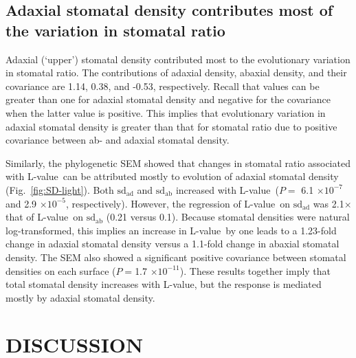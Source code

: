 \documentclass[12pt, oneside]{article}
\newcommand{\el}{L-value}
\begin{document}
\subsection*{Adaxial stomatal density contributes most of the variation in stomatal ratio}

Adaxial (`upper') stomatal density contributed most to the evolutionary variation in stomatal ratio. The contributions of adaxial density, abaxial density, and their covariance are 1.14, 0.38, and -0.53, respectively. Recall that values can be greater than one for adaxial stomatal density and negative for the covariance when the latter value is positive. This implies that evolutionary variation in adaxial stomatal density is greater than that for stomatal ratio due to positive covariance between ab- and adaxial stomatal density.

Similarly, the phylogenetic SEM showed that changes in stomatal ratio associated with \el~can be attributed mostly to evolution of adaxial stomatal density (Fig.~\ref{fig:SD-light}). Both $\mathrm{sd_{ad}}$ and $\mathrm{sd_{ab}}$ increased with \el~($P =$ 6.1 $\times10^{-7}$ and 2.9 $\times10^{-5}$, respectively). However, the regression of \el~on $\mathrm{sd_{ad}}$ was 2.1$\times$ that of \el~on $\mathrm{sd_{ab}}$ (0.21 versus 0.1). Because stomatal densities were natural log-transformed, this implies an increase in \el~by one leads to a 1.23-fold change in adaxial stomatal density versus a 1.1-fold change in abaxial stomatal density. The SEM also showed a significant positive covariance between stomatal densities on each surface ($P = $1.7 $\times10^{-11}$). These results together imply that total stomatal density increases with \el, but the response is mediated mostly by adaxial stomatal density.



\section*{DISCUSSION}
\end{document}
